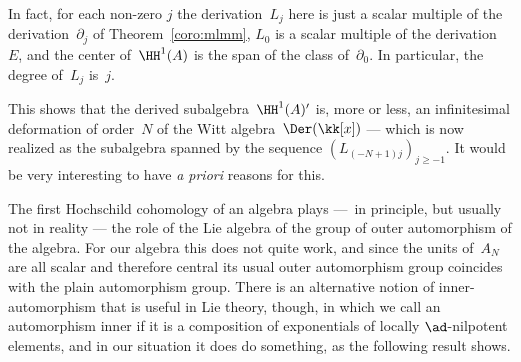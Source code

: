 In fact, for each non-zero $j$ the derivation~$L_j$ here is just a scalar
multiple of the derivation~$\partial_j$ of Theorem~\ref{coro:mlmm}, $L_0$
is a scalar multiple of the derivation~$E$, and the center of~$\HH^1(A)$ is
the span of the class of~$\partial_0$. In particular, the degree of~$L_j$
is~$j$.

This shows that the derived subalgebra~$\HH^1(A)'$ is, more or less, an
infinitesimal deformation of order~$N$ of the Witt algebra~$\Der(\kk[x])$
--- which is now realized as the subalgebra spanned by the sequence
$(L_{(-N+1)j})_{j\geq-1}$. It would be very interesting to have \emph{a
priori} reasons for this.

\bigskip

The first Hochschild cohomology of an algebra plays ---~in principle, but
usually not in reality ---  the role of the Lie algebra of the group of
outer automorphism of the algebra. For our algebra this does not quite
work, and since the units of~$A_N$ are all scalar and therefore central its
usual outer automorphism group coincides with the plain automorphism group.
There is an alternative notion of inner-automorphism that is useful in Lie
theory, though, in which we call an automorphism inner if it is a
composition of exponentials of locally $\ad$-nilpotent elements, and in our
situation it does do something, as the following result shows.

